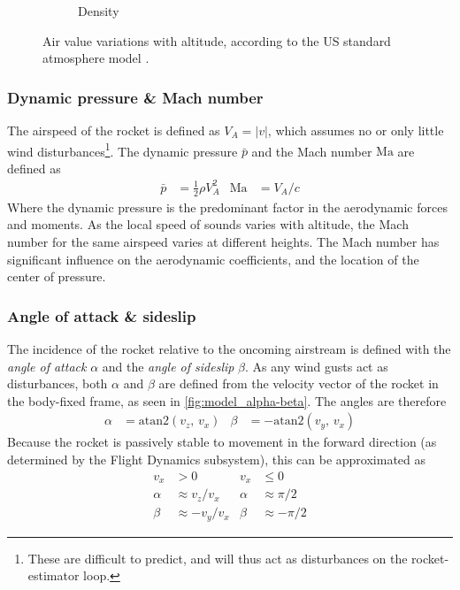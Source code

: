 \begin{figure}[ht]
\begin{subfigure}{0.32\textwidth}
        \caption{Density}
        \label{fig:atmos-density}
    \end{subfigure}
    \caption[US standard atmosphere model]{Air value  variations with altitude, according to the US standard atmosphere model \cite{stengel2004}.}
    \label{fig:atmosphere}
\end{figure}

\subsubsection{Dynamic pressure \& Mach number}
The airspeed of the rocket is defined as $V_A = |v|$, which assumes no or only little wind disturbances\footnote{These are difficult to predict, and will thus act as disturbances on the rocket-estimator loop.}.
The dynamic pressure $\bar p$ and the Mach number $\mathrm{Ma}$ are defined as
\begin{align}
    \bar p &= \frac{1}{2} \rho V_A^2 
    &
    \mathrm{Ma} &= V_A / c
\end{align}
Where the dynamic pressure is the predominant factor in the aerodynamic forces and moments.
As the local speed of sounds varies with altitude, the Mach number for the same airspeed varies at different heights.
The Mach number has significant influence on the aerodynamic coefficients, and the location of the center of pressure.


\subsubsection{Angle of attack \& sideslip}
The incidence of the rocket relative to the oncoming airstream is defined with the \textit{angle of attack} $\alpha$ and the \textit{angle of sideslip} $\beta$.
As any wind gusts act as disturbances, both $\alpha$ and $\beta$ are defined from the velocity vector of the rocket in the body-fixed frame, as seen in \autoref{fig:model_alpha-beta}.
The angles are therefore
\begin{align}
        \alpha &= \mathrm{atan2}(v_z, \, v_x) &  \beta &= - \mathrm{atan2}(v_y, \,v_x)
\end{align}
Because the rocket is passively stable to movement in the forward direction (as determined by the Flight Dynamics subsystem), this can be approximated as
\begin{align}
    v_x &> 0 & v_x &\leq 0 \nonumber \\
    \alpha &\approx v_z/v_x  & \alpha &\approx \pi/2 \\
    \beta &\approx - v_y/v_x & \beta &\approx - \pi/2
\end{align}

